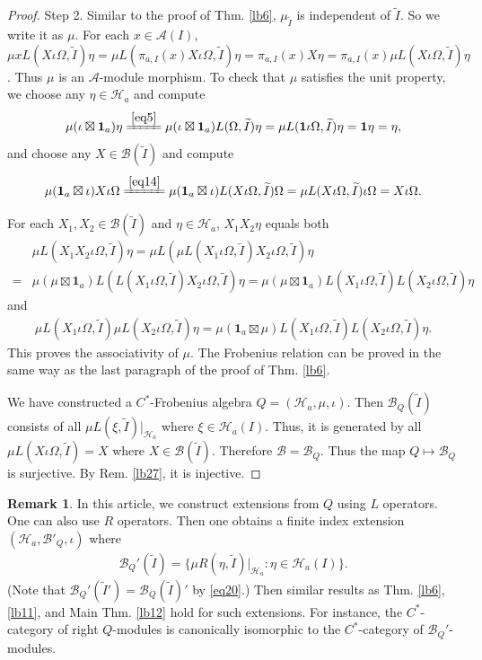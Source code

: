 \documentclass[12pt,a4paper,notitlepage]{article}
\theoremstyle{definition}
\newtheorem{rem}[df]{Remark}
\theoremstyle{plain}
\newcommand{\mc}{\mathcal}
\newcommand{\wtd}{\widetilde}
\newcommand{\id}{\mathbf{1}}
\numberwithin{equation}{section}
\begin{document}
\begin{proof}
Step 2. Similar to the proof of Thm. \ref{lb6}, $\mu_{\wtd I}$ is independent of $\wtd I$. So we write it as $\mu$. For each $x\in\mc A(I)$, $\mu xL(X\iota\Omega,\wtd I)\eta=\mu L(\pi_{a,I}(x) X\iota\Omega,\wtd I)\eta=\pi_{a,I}(x) X\eta=\pi_{a,I}(x)\mu L(X\iota\Omega,\wtd I)\eta$. Thus $\mu$ is an $\mc A$-module morphism. To check that $\mu$ satisfies the unit property, we choose any $\eta\in\mc H_a$ and compute
\begin{align*}
\mu(\iota\boxtimes\id_a)\eta\xlongequal{\eqref{eq5}}\mu(\iota\boxtimes\id_a)L(\Omega,\wtd I)\eta=\mu L(\id \iota\Omega,\wtd I)\eta=\id\eta=\eta,	
\end{align*}
and choose any $X\in\mc B(\wtd I)$ and compute
\begin{align*}
\mu (\id_a\boxtimes\iota)X\iota\Omega\xlongequal{\eqref{eq14}}\mu (\id_a\boxtimes\iota)L(X\iota\Omega,\wtd I)\Omega=\mu L(X\iota\Omega,\wtd I)\iota\Omega=X\iota\Omega.
\end{align*}

For each $X_1,X_2\in\mc B(\wtd I)$ and $\eta\in\mc H_a$, $X_1X_2\eta$ equals both
\begin{align*}
&\mu L(X_1X_2\iota\Omega,\wtd I)\eta=\mu L(\mu L(X_1\iota\Omega,\wtd I)X_2\iota\Omega,\wtd I)\eta\\
=&\mu(\mu\boxtimes\id_a) L(L(X_1\iota\Omega,\wtd I)X_2\iota\Omega,\wtd I)\eta=\mu(\mu\boxtimes\id_a) L(X_1\iota\Omega,\wtd I)L(X_2\iota\Omega,\wtd I)\eta	
\end{align*}
and
\begin{align*}
\mu L(X_1\iota\Omega,\wtd I)\mu L(X_2\iota\Omega,\wtd I)\eta	=\mu(\id_a\boxtimes\mu) L(X_1\iota\Omega,\wtd I)L(X_2\iota\Omega,\wtd I)\eta.
\end{align*}
This proves the associativity of $\mu$. The Frobenius relation can be proved in the same way as the last paragraph of the proof of Thm. \ref{lb6}. 

We have constructed a $C^*$-Frobenius algebra $Q=(\mc H_a,\mu,\iota)$. Then $\mc B_Q(\wtd I)$ consists of all $\mu L(\xi,\wtd I)|_{\mc H_a}$ where $\xi\in\mc H_a(I)$. Thus, it is generated by all $\mu L(X\iota\Omega,\wtd I)=X$ where $X\in\mc B(\wtd I)$. Therefore $\mc B=\mc B_Q$. Thus the map $Q\mapsto\mc B_Q$ is surjective. By Rem. \ref{lb27}, it is injective.
\end{proof}




\begin{rem}\label{lb14}
In this article, we construct extensions from $Q$ using $L$ operators. One can also use $R$ operators. Then one obtains a finite index extension $(\mc H_a,\mc B'_Q,\iota)$ where
\begin{align}
\mc B_Q'(\wtd I)=	\{\mu R(\eta,\wtd I)|_{\mc H_a}:\eta\in\mc H_a(I)\}.
\end{align}
(Note that $\mc B_Q'(\wtd I')=\mc B_Q(\wtd I)'$ by \eqref{eq20}.) Then similar results as Thm. \ref{lb6}, \ref{lb11}, and Main Thm.  \ref{lb12} hold for such extensions. For instance, the $C^*$-category of right $Q$-modules is canonically isomorphic to the $C^*$-category of $\mc B_Q'$-modules.
\end{rem}
\end{document}
